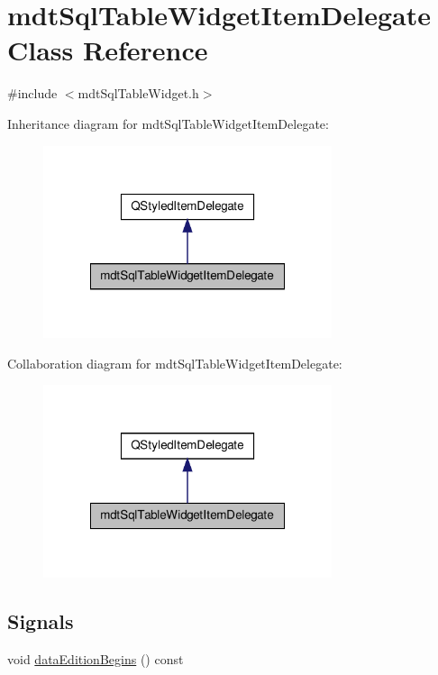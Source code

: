 \hypertarget{classmdt_sql_table_widget_item_delegate}{\section{mdt\-Sql\-Table\-Widget\-Item\-Delegate Class Reference}
\label{classmdt_sql_table_widget_item_delegate}
}


{\ttfamily \#include $<$mdt\-Sql\-Table\-Widget.\-h$>$}



Inheritance diagram for mdt\-Sql\-Table\-Widget\-Item\-Delegate\-:
\nopagebreak
\begin{figure}[H]
\begin{center}
\leavevmode
\includegraphics[width=240pt]{classmdt_sql_table_widget_item_delegate__inherit__graph}
\end{center}
\end{figure}


Collaboration diagram for mdt\-Sql\-Table\-Widget\-Item\-Delegate\-:
\nopagebreak
\begin{figure}[H]
\begin{center}
\leavevmode
\includegraphics[width=240pt]{classmdt_sql_table_widget_item_delegate__coll__graph}
\end{center}
\end{figure}
\subsection*{Signals}
\begin{DoxyCompactItemize}
\item 
void \hyperlink{classmdt_sql_table_widget_item_delegate_af2fdf7d0a1ead61dccdb047240e96643}{data\-Edition\-Begins} () const 
\end{DoxyCompactItemize}
